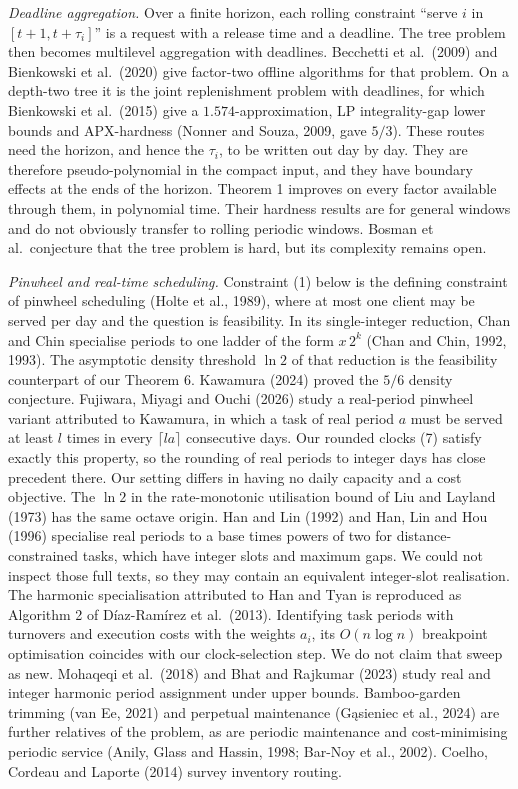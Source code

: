 \documentclass[
  british,
  11pt,
  a4paper,
]{article}
\begin{document}
\emph{Deadline aggregation.} Over a finite horizon, each rolling
constraint ``serve \(i\) in \([t+1,t+\tau_i]\)'' is a request with a
release time and a deadline. The tree problem then becomes multilevel
aggregation with deadlines. Becchetti et al.~(2009) and Bienkowski et
al.~(2020) give factor-two offline algorithms for that problem. On a
depth-two tree it is the joint replenishment problem with deadlines, for
which Bienkowski et al.~(2015) give a \(1.574\)-approximation, LP
integrality-gap lower bounds and APX-hardness (Nonner and Souza, 2009,
gave \(5/3\)). These routes need the horizon, and hence the \(\tau_i\),
to be written out day by day. They are therefore pseudo-polynomial in
the compact input, and they have boundary effects at the ends of the
horizon. Theorem 1 improves on every factor available through them, in
polynomial time. Their hardness results are for general windows and do
not obviously transfer to rolling periodic windows. Bosman et
al.~conjecture that the tree problem is hard, but its complexity remains
open.

\emph{Pinwheel and real-time scheduling.} Constraint (1) below is the
defining constraint of pinwheel scheduling (Holte et al., 1989), where
at most one client may be served per day and the question is
feasibility. In its single-integer reduction, Chan and Chin specialise
periods to one ladder of the form \(x\,2^k\) (Chan and Chin, 1992,
1993). The asymptotic density threshold \(\ln2\) of that reduction is
the feasibility counterpart of our Theorem 6. Kawamura (2024) proved the
\(5/6\) density conjecture. Fujiwara, Miyagi and Ouchi (2026) study a
real-period pinwheel variant attributed to Kawamura, in which a task of
real period \(a\) must be served at least \(l\) times in every
\(\lceil la\rceil\) consecutive days. Our rounded clocks (7) satisfy
exactly this property, so the rounding of real periods to integer days
has close precedent there. Our setting differs in having no daily
capacity and a cost objective. The \(\ln2\) in the rate-monotonic
utilisation bound of Liu and Layland (1973) has the same octave origin.
Han and Lin (1992) and Han, Lin and Hou (1996) specialise real periods
to a base times powers of two for distance-constrained tasks, which have
integer slots and maximum gaps. We could not inspect those full texts,
so they may contain an equivalent integer-slot realisation. The harmonic
specialisation attributed to Han and Tyan is reproduced as Algorithm 2
of Díaz-Ramírez et al.~(2013). Identifying task periods with turnovers
and execution costs with the weights \(a_i\), its \(O(n\log n)\)
breakpoint optimisation coincides with our clock-selection step. We do
not claim that sweep as new. Mohaqeqi et al.~(2018) and Bhat and
Rajkumar (2023) study real and integer harmonic period assignment under
upper bounds. Bamboo-garden trimming (van Ee, 2021) and perpetual
maintenance (Gąsieniec et al., 2024) are further relatives of the
problem, as are periodic maintenance and cost-minimising periodic
service (Anily, Glass and Hassin, 1998; Bar-Noy et al., 2002). Coelho,
Cordeau and Laporte (2014) survey inventory routing.
\end{document}
